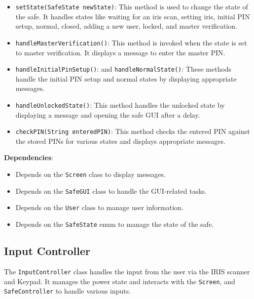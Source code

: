 \documentclass{article}
\begin{document}
\begin{itemize}
    \item \texttt{setState(SafeState newState)}: This method is used to change the state of the safe. It handles states like waiting for an iris scan, setting iris, initial PIN setup, normal, closed, adding a new user, locked, and master verification.
    \item \texttt{handleMasterVerification()}: This method is invoked when the state is set to master verification. It displays a message to enter the master PIN.
    \item \texttt{handleInitialPinSetup()}: and \texttt{handleNormalState()}: These methods handle the initial PIN setup and normal states by displaying appropriate messages.
    \item \texttt{handleUnlockedState()}: This method handles the unlocked state by displaying a message and opening the safe GUI after a delay.
    \item \texttt{checkPIN(String enteredPIN)}: This method checks the entered PIN against the stored PINs for various states and displays appropriate messages.
\end{itemize}
\textbf{Dependencies}:
\begin{itemize}
    \item Depends on the \texttt{Screen} class to display messages.
    \item Depends on the \texttt{SafeGUI} class to handle the GUI-related tasks.
    \item Depends on the \texttt{User} class to manage user information.
    \item Depends on the \texttt{SafeState} enum to manage the state of the safe.
\end{itemize}

\subsection{Input Controller}
The \texttt{InputController} class handles the input from the user via the IRIS scanner and Keypad. It manages the power state and interacts with the \texttt{Screen}, and \texttt{SafeController} to handle various inputs.
\end{document}
